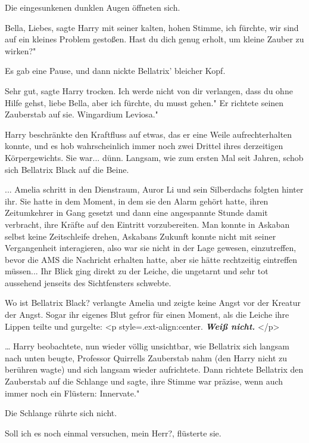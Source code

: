 Die eingesunkenen dunklen Augen öffneten sich.

\glqq Bella, Liebes\grqq{}, sagte Harry mit seiner kalten, hohen Stimme, \glqq
ich fürchte, wir sind auf ein kleines Problem gestoßen. Hast du dich genug
erholt, um kleine Zauber zu wirken?"

Es gab eine Pause, und dann nickte Bellatrix' bleicher Kopf.

\glqq Sehr gut\grqq{}, sagte Harry trocken. \glqq Ich werde nicht von dir
verlangen, dass du ohne Hilfe gehst, liebe Bella, aber ich fürchte, du musst
gehen." Er richtete seinen Zauberstab auf sie. \glqq Wingardium Leviosa."

Harry beschränkte den Kraftfluss auf etwas, das er eine Weile aufrechterhalten
konnte, und es hob wahrscheinlich immer noch zwei Drittel ihres derzeitigen
Körpergewichts. Sie war... dünn. Langsam, wie zum ersten Mal seit Jahren, schob
sich Bellatrix Black auf die Beine.

... Amelia schritt in den Dienstraum, Auror Li und sein Silberdachs folgten
hinter ihr. Sie hatte in dem Moment, in dem sie den Alarm gehört hatte, ihren
Zeitumkehrer in Gang gesetzt und dann eine angespannte Stunde damit verbracht,
ihre Kräfte auf den Eintritt vorzubereiten. Man konnte in Askaban selbst keine
Zeitschleife drehen, Askabans Zukunft konnte nicht mit seiner Vergangenheit
interagieren, also war sie nicht in der Lage gewesen, einzutreffen, bevor die
AMS die Nachricht erhalten hatte, aber sie hätte rechtzeitig eintreffen
müssen... Ihr Blick ging direkt zu der Leiche, die ungetarnt und sehr tot
aussehend jenseits des Sichtfensters schwebte.

\glqq Wo ist Bellatrix Black?\grqq{} verlangte Amelia und zeigte keine Angst vor
der Kreatur der Angst. Sogar ihr eigenes Blut gefror für einen Moment, als die
Leiche ihre Lippen teilte und gurgelte: <p
style=\grqq{}.ext-align:center\grqq{}. \textbf{\emph{ \glqq Weiß nicht.\grqq{}
}}</p>

… Harry beobachtete, nun wieder völlig unsichtbar, wie Bellatrix sich langsam
nach unten beugte, Professor Quirrells Zauberstab nahm (den Harry nicht zu
berühren wagte) und sich langsam wieder aufrichtete. Dann richtete Bellatrix den
Zauberstab auf die Schlange und sagte, ihre Stimme war präzise, wenn auch immer
noch ein Flüstern: \glqq Innervate."

Die Schlange rührte sich nicht.

\glqq Soll ich es noch einmal versuchen, mein Herr?\grqq{}, flüsterte sie.

